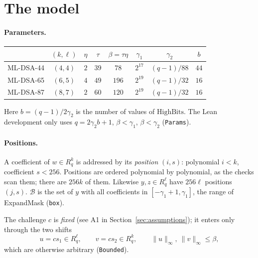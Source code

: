 \documentclass[11pt]{article}
\theoremstyle{definition}
\theoremstyle{remark}
\newcommand{\Rq}{R_q}
\newcommand{\lean}[1]{\texttt{#1}}
\begin{document}
\section{The model}

\paragraph{Parameters.}
\begin{center}
\begin{tabular}{lccccccc}
\toprule
 & $(k,\ell)$ & $\eta$ & $\tau$ & $\beta=\tau\eta$ & $\gamma_1$ & $\gamma_2$ & $b$ \\
\midrule
ML-DSA-44 & $(4,4)$ & $2$ & $39$ & $78$  & $2^{17}$ & $(q-1)/88$ & $44$ \\
ML-DSA-65 & $(6,5)$ & $4$ & $49$ & $196$ & $2^{19}$ & $(q-1)/32$ & $16$ \\
ML-DSA-87 & $(8,7)$ & $2$ & $60$ & $120$ & $2^{19}$ & $(q-1)/32$ & $16$ \\
\bottomrule
\end{tabular}
\end{center}
Here $b = (q-1)/2\gamma_2$ is the number of values of $\mathrm{HighBits}$. The Lean development
only uses $q = 2\gamma_2 b + 1$, $\beta<\gamma_1$, $\beta<\gamma_2$ (\lean{Params}).

\paragraph{Positions.}
A coefficient of $w \in \Rq^k$ is addressed by its \emph{position} $(i,s)$: polynomial
$i<k$, coefficient $s<256$. Positions are ordered polynomial by polynomial, as the checks scan
them; there are $256k$ of them. Likewise $y, z \in \Rq^\ell$ have $256\ell$ positions $(j,s)$.
$\mathcal{B}$ is the set of $y$ with all coefficients in $[-\gamma_1+1,\gamma_1]$, the range of
ExpandMask (\lean{box}).

The challenge $c$ is \emph{fixed} (see A1 in Section~\ref{sec:assumptions}); it enters only through
the two shifts
\[
  u = cs_1 \in \Rq^\ell,\qquad v = cs_2 \in \Rq^k,\qquad \|u\|_\infty,\ \|v\|_\infty \le \beta,
\]
which are otherwise arbitrary (\lean{Bounded}).
\end{document}

